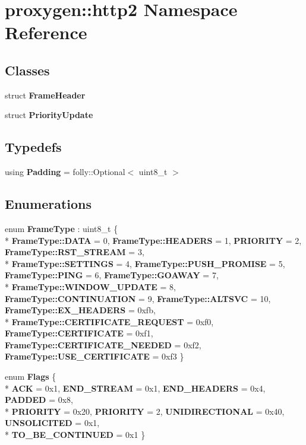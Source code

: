 \section{proxygen\+:\+:http2 Namespace Reference}
\label{namespaceproxygen_1_1http2}
\subsection*{Classes}
\begin{DoxyCompactItemize}
\item 
struct {\bf Frame\+Header}
\item 
struct {\bf Priority\+Update}
\end{DoxyCompactItemize}
\subsection*{Typedefs}
\begin{DoxyCompactItemize}
\item 
using {\bf Padding} = folly\+::\+Optional$<$ uint8\+\_\+t $>$
\end{DoxyCompactItemize}
\subsection*{Enumerations}
\begin{DoxyCompactItemize}
\item 
enum {\bf Frame\+Type} \+: uint8\+\_\+t \{ \\*
{\bf Frame\+Type\+::\+D\+A\+TA} = 0, 
{\bf Frame\+Type\+::\+H\+E\+A\+D\+E\+RS} = 1, 
{\bf P\+R\+I\+O\+R\+I\+TY} = 2, 
{\bf Frame\+Type\+::\+R\+S\+T\+\_\+\+S\+T\+R\+E\+AM} = 3, 
\\*
{\bf Frame\+Type\+::\+S\+E\+T\+T\+I\+N\+GS} = 4, 
{\bf Frame\+Type\+::\+P\+U\+S\+H\+\_\+\+P\+R\+O\+M\+I\+SE} = 5, 
{\bf Frame\+Type\+::\+P\+I\+NG} = 6, 
{\bf Frame\+Type\+::\+G\+O\+A\+W\+AY} = 7, 
\\*
{\bf Frame\+Type\+::\+W\+I\+N\+D\+O\+W\+\_\+\+U\+P\+D\+A\+TE} = 8, 
{\bf Frame\+Type\+::\+C\+O\+N\+T\+I\+N\+U\+A\+T\+I\+ON} = 9, 
{\bf Frame\+Type\+::\+A\+L\+T\+S\+VC} = 10, 
{\bf Frame\+Type\+::\+E\+X\+\_\+\+H\+E\+A\+D\+E\+RS} = 0xfb, 
\\*
{\bf Frame\+Type\+::\+C\+E\+R\+T\+I\+F\+I\+C\+A\+T\+E\+\_\+\+R\+E\+Q\+U\+E\+ST} = 0xf0, 
{\bf Frame\+Type\+::\+C\+E\+R\+T\+I\+F\+I\+C\+A\+TE} = 0xf1, 
{\bf Frame\+Type\+::\+C\+E\+R\+T\+I\+F\+I\+C\+A\+T\+E\+\_\+\+N\+E\+E\+D\+ED} = 0xf2, 
{\bf Frame\+Type\+::\+U\+S\+E\+\_\+\+C\+E\+R\+T\+I\+F\+I\+C\+A\+TE} = 0xf3
 \}
\item 
enum {\bf Flags} \{ \\*
{\bf A\+CK} = 0x1, 
{\bf E\+N\+D\+\_\+\+S\+T\+R\+E\+AM} = 0x1, 
{\bf E\+N\+D\+\_\+\+H\+E\+A\+D\+E\+RS} = 0x4, 
{\bf P\+A\+D\+D\+ED} = 0x8, 
\\*
{\bf P\+R\+I\+O\+R\+I\+TY} = 0x20, 
{\bf P\+R\+I\+O\+R\+I\+TY} = 2, 
{\bf U\+N\+I\+D\+I\+R\+E\+C\+T\+I\+O\+N\+AL} = 0x40, 
{\bf U\+N\+S\+O\+L\+I\+C\+I\+T\+ED} = 0x1, 
\\*
{\bf T\+O\+\_\+\+B\+E\+\_\+\+C\+O\+N\+T\+I\+N\+U\+ED} = 0x1
 \}
\end{DoxyCompactItemize}
